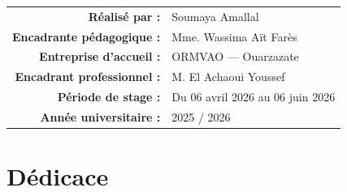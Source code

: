 \documentclass[12pt,a4paper]{report}
\begin{document}
\begin{titlepage}
\begin{center}
\end{center}
\vspace{1.5cm}
\begin{tabular}{rl}
\textbf{Réalisé par :}            & Soumaya Amallal \\[4pt]
\textbf{Encadrante pédagogique :} & Mme. Wassima Aït Farès \\[4pt]
\textbf{Entreprise d'accueil :}   & ORMVAO --- Ouarzazate \\[4pt]
\textbf{Encadrant professionnel :}& M. El Achaoui Youssef \\[4pt]
\textbf{Période de stage :}       & Du 06 avril 2026 au 06 juin 2026 \\[4pt]
\textbf{Année universitaire :}    & 2025 / 2026 \\
\end{tabular}

\end{titlepage}  %


\chapter*{Dédicace}
\thispagestyle{empty}
\end{document}
